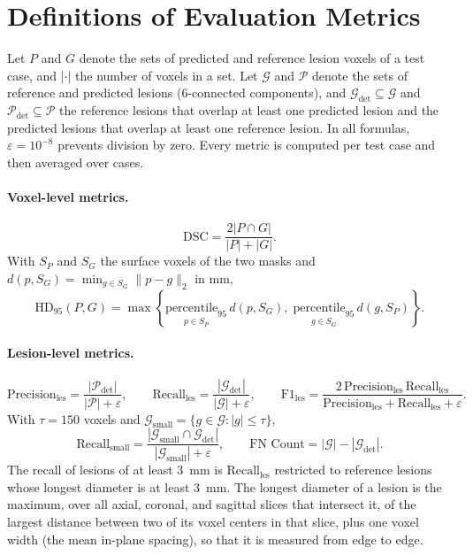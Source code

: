 \section{Definitions of Evaluation Metrics}
\label{appendix:metrics}

Let $P$ and $G$ denote the sets of predicted and reference lesion voxels of
a test case, and $|\cdot|$ the number of voxels in a set. Let
$\mathcal{G}$ and $\mathcal{P}$ denote the sets of reference and predicted
lesions (6-connected components), and
$\mathcal{G}_{\mathrm{det}} \subseteq \mathcal{G}$ and
$\mathcal{P}_{\mathrm{det}} \subseteq \mathcal{P}$ the reference lesions
that overlap at least one predicted lesion and the predicted lesions that
overlap at least one reference lesion. In all formulas,
$\varepsilon = 10^{-8}$ prevents division by zero. Every metric is computed
per test case and then averaged over cases.

\paragraph{Voxel-level metrics.}
\begin{equation}
\mathrm{DSC} = \frac{2|P \cap G|}{|P| + |G|}.
\end{equation}
With $S_P$ and $S_G$ the surface voxels of the two masks and
$d(p, S_G) = \min_{g \in S_G} \lVert p - g \rVert_2$ in mm,
\begin{equation}
\mathrm{HD}_{95}(P,G) =
\max \left\{
\underset{p \in S_P}{\mathrm{percentile}_{95}}\, d(p, S_G),\;
\underset{g \in S_G}{\mathrm{percentile}_{95}}\, d(g, S_P)
\right\}.
\end{equation}

\paragraph{Lesion-level metrics.}
\begin{equation}
\mathrm{Precision}_{\mathrm{les}} =
\frac{|\mathcal{P}_{\mathrm{det}}|}{|\mathcal{P}| + \varepsilon},
\qquad
\mathrm{Recall}_{\mathrm{les}} =
\frac{|\mathcal{G}_{\mathrm{det}}|}{|\mathcal{G}| + \varepsilon},
\qquad
\mathrm{F1}_{\mathrm{les}} =
\frac{2 \, \mathrm{Precision}_{\mathrm{les}} \, \mathrm{Recall}_{\mathrm{les}}}
{\mathrm{Precision}_{\mathrm{les}} + \mathrm{Recall}_{\mathrm{les}} + \varepsilon}.
\end{equation}
With $\tau = 150$ voxels and
$\mathcal{G}_{\mathrm{small}} = \{ g \in \mathcal{G} : |g| \leq \tau \}$,
\begin{equation}
\mathrm{Recall}_{\mathrm{small}} =
\frac{|\mathcal{G}_{\mathrm{small}} \cap \mathcal{G}_{\mathrm{det}}|}
{|\mathcal{G}_{\mathrm{small}}| + \varepsilon},
\qquad
\text{FN Count} = |\mathcal{G}| - |\mathcal{G}_{\mathrm{det}}|.
\end{equation}
The recall of lesions of at least 3~mm is $\mathrm{Recall}_{\mathrm{les}}$
restricted to reference lesions whose longest diameter is at least 3~mm.
The longest diameter of a lesion is the maximum, over all axial, coronal,
and sagittal slices that intersect it, of the largest distance between two
of its voxel centers in that slice, plus one voxel width (the mean in-plane
spacing), so that it is measured from edge to edge.

